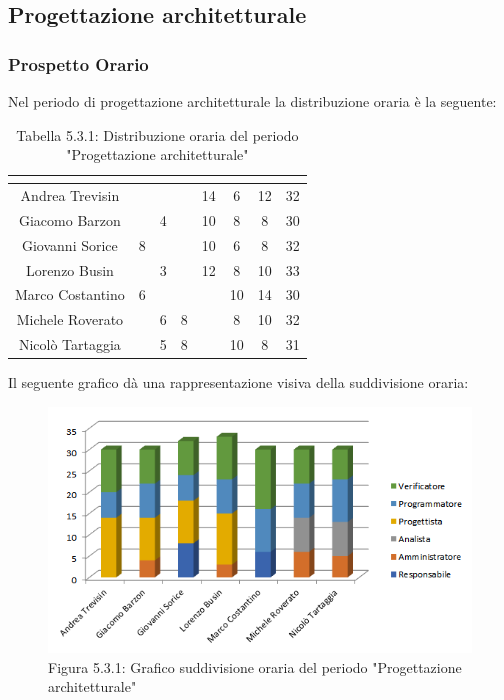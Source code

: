 \subsection{Progettazione architetturale}

\subsubsection{Prospetto Orario}
Nel periodo di progettazione architetturale la distribuzione oraria è la seguente:

\renewcommand{\arraystretch}{1.5}
\begin{table}[H]
\begin{center}
\begin{tabular}{|c|c|c|c|c|c|c|c|}
\hline
\rowcolor{title_row}
\textbf{\color{title_text}{Nome}} & \textbf{\color{title_text}{Resp.}} & \textbf{\color{title_text}{Ammi.}} & \textbf{\color{title_text}{Analist.}} & \textbf{\color{title_text}{Progett.}} & \textbf{\color{title_text}{Program.}} & \textbf{\color{title_text}{Verific.}} & \textbf{\color{title_text}{Totale}} \\ \hline
Andrea Trevisin  & & & & 14 & 6 & 12 & 32 \\ \hline
Giacomo Barzon   &  & 4 &  & 10 & 8 & 8 & 30\\ \hline
Giovanni Sorice  & 8 &  &  & 10 & 6 & 8 & 32\\ \hline
Lorenzo Busin    &  & 3  &  & 12 & 8 & 10 & 33\\ \hline
Marco Costantino & 6 &  &  &  & 10 & 14 & 30\\ \hline
Michele Roverato &  & 6 & 8 &  & 8 & 10 & 32\\ \hline
Nicolò Tartaggia &  & 5  & 8 &  & 10 & 8 & 31\\ \hline
\end{tabular}
\caption{Tabella 5.3.1: Distribuzione oraria del periodo "Progettazione architetturale"\label{}}
\end{center}
\end{table}
\renewcommand{\arraystretch}{1}

Il seguente grafico dà una rappresentazione visiva della suddivisione oraria: \\
\begin{figure} [H]
	\centering
	\includegraphics[scale=1]{Res/ExcelGrafici/Grafici/ProgettazioneOre.png}
	\caption{Figura 5.3.1: Grafico suddivisione oraria del periodo "Progettazione architetturale"}\label{}
\end{figure}


